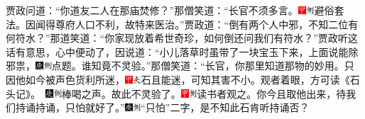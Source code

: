 贾政问道：“你道友二人在那庙焚修？”那僧笑道：“长官不须多言。{\includegraphics[width=3mm]{../Images/00002}\includegraphics[width=3mm]{../Images/00011}\footnotesize \kaishu 避俗套法。}因闻得尊府人口不利，故特来医治。”贾政道：“倒有两个人中邪，不知二位有何符水？”那道笑道：“你家现放着希世奇珍，如何倒还问我们有符水？”贾政听这话有意思，心中便动了，因说道：“小儿落草时虽带了一块宝玉下来，上面说能除邪祟，{\includegraphics[width=3mm]{../Images/00004}\includegraphics[width=3mm]{../Images/00011}\footnotesize \kaishu 点题。}谁知竟不灵验。”那僧笑道：“长官，你那里知道那物的妙用。只因他如今被声色货利所迷，{\includegraphics[width=3mm]{../Images/00002}\includegraphics[width=3mm]{../Images/00012}\footnotesize \kaishu 石且能迷，可知其害不小。观者着眼，方可读《石头记》。　\includegraphics[width=3mm]{../Images/00004}\includegraphics[width=3mm]{../Images/00011}\footnotesize \kaishu 棒喝之声。}故此不灵验了。{\includegraphics[width=3mm]{../Images/00002}\includegraphics[width=3mm]{../Images/00011}\footnotesize \kaishu 读书者观之。}你今且取他出来，待我们持诵持诵，只怕就好了。”{\includegraphics[width=3mm]{../Images/00004}\includegraphics[width=3mm]{../Images/00011}\footnotesize \kaishu “只怕”二字，是不知此石肯听持诵否？}

